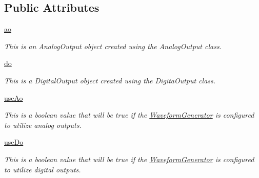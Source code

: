 \subsection*{Public Attributes}
\begin{DoxyCompactItemize}
\item 
\hyperlink{class_chassis_8git_1_1_waveform_generator_1_1_waveform_generator_a02eee3f13b9ae6399553205f3204f1d1}{ao}
\begin{DoxyCompactList}\small\item\em This is an Analog\-Output object created using the Analog\-Output class. \end{DoxyCompactList}\item 
\hyperlink{class_chassis_8git_1_1_waveform_generator_1_1_waveform_generator_a46a8a04fef697158b2274fa12033a6e0}{do}
\begin{DoxyCompactList}\small\item\em This is a Digital\-Output object created using the Digita\-Output class. \end{DoxyCompactList}\item 
\hyperlink{class_chassis_8git_1_1_waveform_generator_1_1_waveform_generator_a914dc22840386507f16100c0c7028b7e}{use\-Ao}
\begin{DoxyCompactList}\small\item\em This is a boolean value that will be true if the \hyperlink{class_chassis_8git_1_1_waveform_generator_1_1_waveform_generator}{Waveform\-Generator} is configured to utilize analog outputs. \end{DoxyCompactList}\item 
\hyperlink{class_chassis_8git_1_1_waveform_generator_1_1_waveform_generator_a94522148c84bc1c3af50f1b35d772e63}{use\-Do}
\begin{DoxyCompactList}\small\item\em This is a boolean value that will be true if the \hyperlink{class_chassis_8git_1_1_waveform_generator_1_1_waveform_generator}{Waveform\-Generator} is configured to utilize digital outputs. \end{DoxyCompactList}\end{DoxyCompactItemize}
